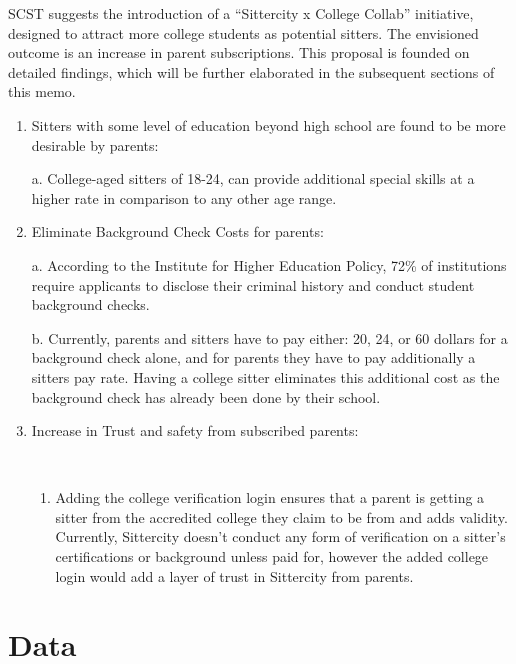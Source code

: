 \documentclass[12pt]{article}
\providecommand{\tightlist}{%
  \setlength{\itemsep}{0pt}\setlength{\parskip}{0pt}}
\begin{document}
SCST suggests the introduction of a ``Sittercity x College Collab''
initiative, designed to attract more college students as potential
sitters. The envisioned outcome is an increase in parent subscriptions.
This proposal is founded on detailed findings, which will be further
elaborated in the subsequent sections of this memo.

\begin{enumerate}
\def\labelenumi{\arabic{enumi}.}
\item
  Sitters with some level of education beyond high school are found to
  be more desirable by parents:

  a. College-aged sitters of 18-24, can provide additional special
  skills at a higher rate in comparison to any other age range.\\
\item
  Eliminate Background Check Costs for parents:

  a. According to the Institute for Higher Education Policy, 72\% of
  institutions require applicants to disclose their criminal history and
  conduct student background checks.

  b. Currently, parents and sitters have to pay either: 20, 24, or 60
  dollars for a background check alone, and for parents they have to pay
  additionally a sitters pay rate. Having a college sitter eliminates
  this additional cost as the background check has already been done by
  their school.
\item
  Increase in Trust and safety from subscribed parents:\\
  \strut \\

  \begin{enumerate}
  \def\labelenumii{\alph{enumii}.}
  \tightlist
  \item
    Adding the college verification login ensures that a parent is
    getting a sitter from the accredited college they claim to be from
    and adds validity. Currently, Sittercity doesn't conduct any form of
    verification on a sitter's certifications or background unless paid
    for, however the added college login would add a layer of trust in
    Sittercity from parents.
  \end{enumerate}
\end{enumerate}

\hypertarget{data}{%
\section{\texorpdfstring{\textbf{Data}}{Data}}\label{data}}
\end{document}

